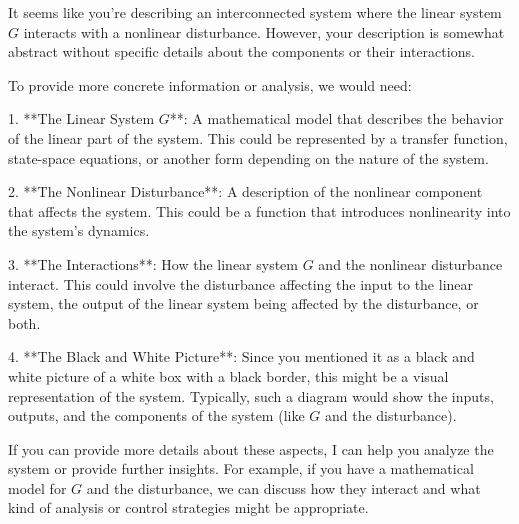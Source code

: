 It seems like you're describing an interconnected system where the linear system \( G \) interacts with a nonlinear disturbance. However, your description is somewhat abstract without specific details about the components or their interactions.

To provide more concrete information or analysis, we would need:

1. **The Linear System \( G \)**: A mathematical model that describes the behavior of the linear part of the system. This could be represented by a transfer function, state-space equations, or another form depending on the nature of the system.
   
2. **The Nonlinear Disturbance**: A description of the nonlinear component that affects the system. This could be a function that introduces nonlinearity into the system's dynamics.

3. **The Interactions**: How the linear system \( G \) and the nonlinear disturbance interact. This could involve the disturbance affecting the input to the linear system, the output of the linear system being affected by the disturbance, or both.

4. **The Black and White Picture**: Since you mentioned it as a black and white picture of a white box with a black border, this might be a visual representation of the system. Typically, such a diagram would show the inputs, outputs, and the components of the system (like \( G \) and the disturbance).

If you can provide more details about these aspects, I can help you analyze the system or provide further insights. For example, if you have a mathematical model for \( G \) and the disturbance, we can discuss how they interact and what kind of analysis or control strategies might be appropriate.